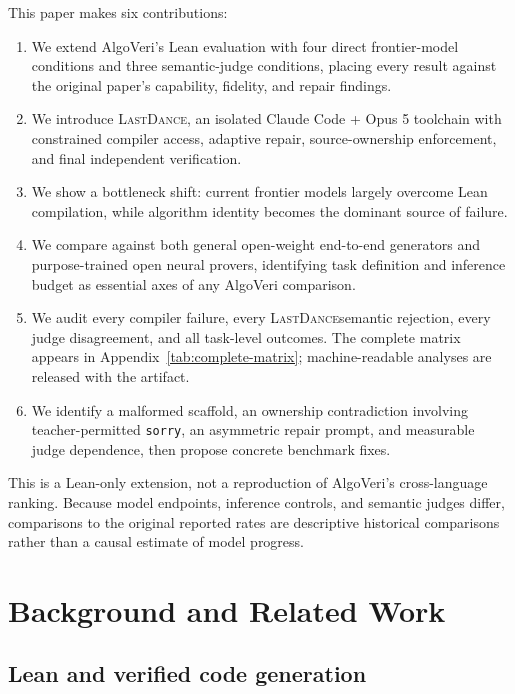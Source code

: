 \documentclass{article}
\newcommand{\lastdance}{\textsc{LastDance}}
\begin{document}
This paper makes six contributions:

\begin{enumerate}[leftmargin=*,itemsep=2pt]
  \item We extend AlgoVeri's Lean evaluation with four direct frontier-model conditions
        and three semantic-judge conditions, placing every result against the original
        paper's capability, fidelity, and repair findings.
  \item We introduce \lastdance, an isolated Claude Code + Opus 5 toolchain with
        constrained compiler access, adaptive repair, source-ownership enforcement,
        and final independent verification.
  \item We show a bottleneck shift: current frontier models largely overcome Lean
        compilation, while algorithm identity becomes the dominant source of failure.
  \item We compare against both general open-weight end-to-end generators and
        purpose-trained open neural provers, identifying task definition and inference
        budget as essential axes of any AlgoVeri comparison.
  \item We audit every compiler failure, every \lastdance semantic rejection, every
        judge disagreement, and all task-level outcomes.  The complete matrix appears
        in Appendix~\ref{tab:complete-matrix}; machine-readable analyses are released
        with the artifact\cite{rerunrepo}.
  \item We identify a malformed scaffold, an ownership contradiction involving
        teacher-permitted \texttt{sorry}, an asymmetric repair prompt, and measurable
        judge dependence, then propose concrete benchmark fixes.
\end{enumerate}

This is a Lean-only extension, not a reproduction of AlgoVeri's cross-language ranking.
Because model endpoints, inference controls, and semantic judges differ, comparisons to
the original reported rates are descriptive historical comparisons rather than a
causal estimate of model progress.

\section{Background and Related Work}

\subsection{Lean and verified code generation}
\end{document}
